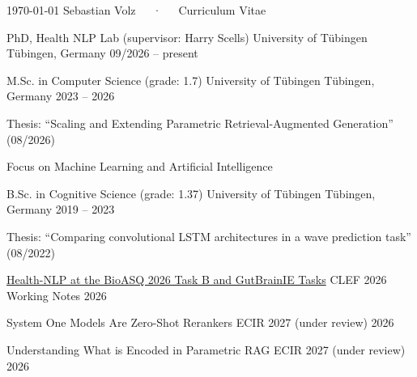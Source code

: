 \documentclass[11pt, a4paper]{awesome-cv}
\begin{document}
\makecvheader

\makecvfooter
  {\today}
  {Sebastian Volz~~~·~~~Curriculum Vitae}
  {\thepage}


\begin{cventries}
  \cventry
    {PhD, Health NLP Lab (supervisor: Harry Scells)}
    {University of Tübingen}
    {Tübingen, Germany}
    {09/2026 -- present}
    {}

  \cventry
    {M.Sc. in Computer Science (grade: 1.7)}
    {University of Tübingen}
    {Tübingen, Germany}
    {2023 -- 2026}
    {
      \begin{cvitems}
        \item {Thesis: ``Scaling and Extending Parametric Retrieval-Augmented Generation'' (08/2026)}
        \item {Focus on Machine Learning and Artificial Intelligence}
      \end{cvitems}
    }

  \cventry
    {B.Sc. in Cognitive Science (grade: 1.37)}
    {University of Tübingen}
    {Tübingen, Germany}
    {2019 -- 2023}
    {
      \begin{cvitems}
        \item {Thesis: ``Comparing convolutional LSTM architectures in a wave prediction task'' (08/2022)}
      \end{cvitems}
    }
\end{cventries}


\begin{cvhonors}
  \cvhonor
    {\href{https://ceur-ws.org/Vol-4283/paper48.pdf}{Health-NLP at the BioASQ 2026 Task B and GutBrainIE Tasks}}
    {CLEF 2026 Working Notes}
    {}
    {2026}

  \cvhonor
    {System One Models Are Zero-Shot Rerankers}
    {ECIR 2027 (under review)}
    {}
    {2026}

  \cvhonor
    {Understanding What is Encoded in Parametric RAG}
    {ECIR 2027 (under review)}
    {}
    {2026}
\end{cvhonors}

\end{document}
